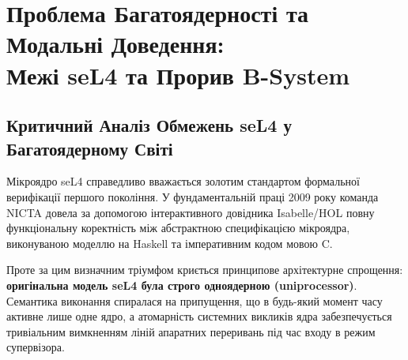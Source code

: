 \documentclass{article}
\begin{document}
\section[Проблема Багатоядерності: seL4 проти B-System]{Проблема Багатоядерності та Модальні Доведення:\\Межі seL4 та Прорив B-System}

\subsection{Критичний Аналіз Обмежень seL4 у Багатоядерному Світі}

Мікроядро seL4 справедливо вважається золотим стандартом формальної верифікації першого покоління. У фундаментальній праці 2009 року команда NICTA довела за допомогою інтерактивного довідника Isabelle/HOL повну функціональну коректність між абстрактною специфікацією мікроядра, виконуваною моделлю на Haskell та імперативним кодом мовою C.

Проте за цим визначним тріумфом криється принципове архітектурне спрощення: \textbf{оригінальна модель seL4 була строго одноядерною (uniprocessor)}. Семантика виконання спиралася на припущення, що в будь-який момент часу активне лише одне ядро, а атомарність системних викликів ядра забезпечується тривіальним вимкненням ліній апаратних переривань під час входу в режим супервізора.
\end{document}

